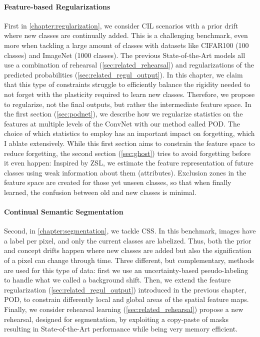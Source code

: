\paragraph{Feature-based Regularizations} First in \autoref{chapter:regularization}, we consider
\acf{CIL} scenarios with a prior drift where new classes are continually added. This is a
challenging benchmark, even more when tackling a large amount of classes with datasets like CIFAR100
(100 classes) and ImageNet (1000 classes). The previous State-of-the-Art models all use a
combination of rehearsal (\autoref{sec:related_rehearsal}) and regularizations of the predicted
probabilities (\autoref{sec:related_regul_output}). In this chapter, we claim that this type of
constraints struggle to efficiently balance the rigidity needed to not forget with the plasticity
required to learn new classes. Therefore, we propose to regularize, not the final outputs, but
rather the intermediate feature space. In the first section (\autoref{sec:podnet}), we describe how
we regularize statistics on the features at multiple levels of the \ac{ConvNet} with our method
called POD. The choice of which statistics to employ has an important impact on forgetting, which I
ablate extensively. While this first section aims to constrain the feature space to reduce
forgetting, the second section (\autoref{sec:ghost}) tries to avoid forgetting before it even
happen: Inspired by \ac{ZSL}, we estimate the feature representation of future classes using weak
information about them (\eg attributes). Exclusion zones in the feature space are created for those
yet unseen classes, so that when finally learned, the confusion between old and new classes is
minimal.

\paragraph{Continual Semantic Segmentation} Second, in \autoref{chapter:segmentation}, we tackle
\acf{CSS}. In this benchmark, images have a label per pixel, and only the current classes are
labelized. Thus, both the prior and concept drifts happen where new classes are added but also the
signification of a pixel can change through time. Three different, but complementary, methods are
used for this type of data: first we use an uncertainty-based pseudo-labeling to handle what we
called a background shift. Then, we extend the feature regularization
(\autoref{sec:related_regul_output}) introduced in the previous chapter, POD, to constrain
differently local and global areas of the spatial feature maps. Finally, we consider rehearsal
learning (\autoref{sec:related_rehearsal}) propose a new rehearsal, designed for segmentation, by
exploiting a copy-paste of masks resulting in State-of-the-Art performance while being very memory
efficient.


